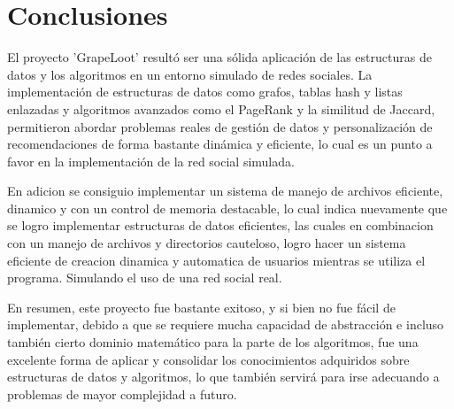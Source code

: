 \section{Conclusiones}
El proyecto ’GrapeLoot' resultó ser una sólida aplicación de las estructuras de datos y los algoritmos en un entorno simulado de redes sociales.  La implementación de estructuras de datos como grafos, tablas hash y listas enlazadas y algoritmos avanzados como el PageRank y la similitud de Jaccard, permitieron abordar problemas reales de gestión de datos y personalización de recomendaciones de forma bastante dinámica y eficiente, lo cual es un punto a favor en la implementación de la red social simulada.

En adicion se consiguio implementar un sistema de manejo de archivos eficiente, dinamico y con un control de memoria destacable, lo cual indica nuevamente que se logro implementar estructuras de datos eficientes, las cuales en combinacion con un manejo de archivos y directorios cauteloso, logro hacer un sistema eficiente de creacion dinamica y automatica de usuarios mientras se utiliza el programa. Simulando el uso de una red social real.


En resumen, este proyecto fue bastante exitoso, y si bien no fue fácil de implementar, debido a que se requiere mucha capacidad de abstracción e incluso también cierto dominio matemático para la parte de los algoritmos, fue una excelente forma de aplicar y consolidar los conocimientos adquiridos sobre estructuras de datos y algoritmos, lo que también servirá para irse adecuando a problemas de mayor complejidad a futuro.

